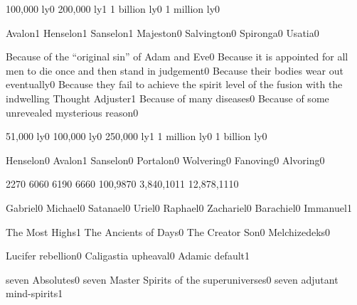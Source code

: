 {100,000 ly}{0}
{200,000 ly}{1}
{1 billion ly}{0}
{1 million ly}{0}
\qstop

{Avalon}{1}
{Henselon}{1}
{Sanselon}{1}
{Majeston}{0}
{Salvington}{0}
{Spironga}{0}
{Usatia}{0}
\qstop

{Because of the ``original sin'' of Adam and Eve}{0}
{Because it is appointed for all men to die once and then stand in judgement}{0}
{Because their bodies wear out eventually}{0}
{Because they fail to achieve the spirit level of the fusion with the indwelling Thought Adjuster}{1}
{Because of many diseases}{0}
{Because of some unrevealed mysterious reason}{0}
\qstop

{51,000 ly}{0}
{100,000 ly}{0}
{250,000 ly}{1}
{1 million ly}{0}
{1 billion ly}{0}
\qstop

{Henselon}{0}
{Avalon}{1}
{Sanselon}{0}
{Portalon}{0}
{Wolvering}{0}
{Fanoving}{0}
{Alvoring}{0}
\qstop

{227}{0}
{606}{0}
{619}{0}
{666}{0}
{100,987}{0}
{3,840,101}{1}
{12,878,111}{0}
\qstop


{Gabriel}{0}
{Michael}{0}
{Satanael}{0}
{Uriel}{0}
{Raphael}{0}
{Zachariel}{0}
{Barachiel}{0}
{Immanuel}{1}
\qstop

{The Most Highs}{1}
{The Ancients of Days}{0}
{The Creator Son}{0}
{Melchizedeks}{0}
\qstop


{Lucifer rebellion}{0}
{Caligastia upheaval}{0}
{Adamic default}{1}
\qstop

{seven Absolutes}{0}
{seven Master Spirits of the superuniverses}{0}
{seven adjutant mind-spirits}{1}
\qstop

